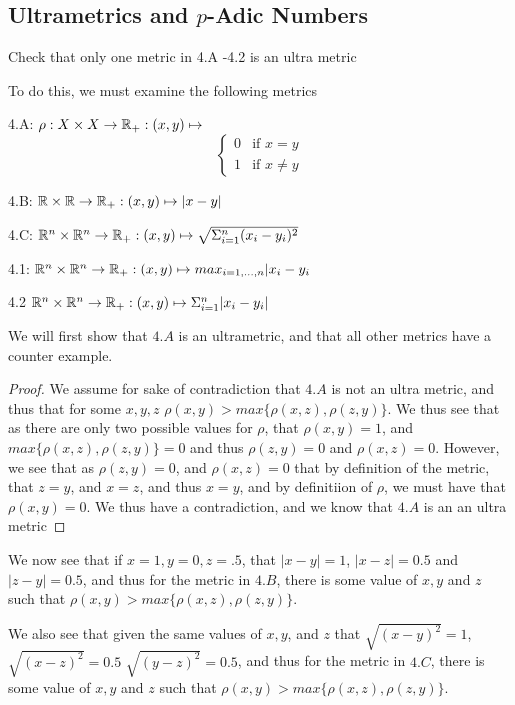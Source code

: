 \subsection{Ultrametrics and $p$-Adic Numbers}

\begin{majorEx}%
  Check that only one metric in 4.A -4.2 is an ultra metric
\end{majorEx}

To do this, we must examine the following metrics

4.A:
$\rho: X\times X \rightarrow \mathbb{R}_+: (x,y) \mapsto $
\[ \begin{cases} 
    0 & \text{if } x=y \\
    1 & \text{if } x \neq y 
  \end{cases}
  \]

4.B: $\mathbb{R} \times \mathbb{R} \rightarrow \mathbb{R}_+ :(x,y) \mapsto |x-y|$

4.C: $\mathbb{R}^n \times \mathbb{R}^n \rightarrow \mathbb{R}_+ : (x,y) \mapsto \sqrt{\Sigma_{i=1}^n (x_i-y_i)^2}$

4.1: $\mathbb{R}^n \times \mathbb{R}^n \rightarrow \mathbb{R}_+ : (x,y) \mapsto max_{i=1,...,n}|x_i-y_i$ 

4.2 $\mathbb{R}^n \times \mathbb{R}^n \rightarrow \mathbb{R}_+ : (x,y) \mapsto \Sigma_{i=1}^n |x_i - y_i|$

We will first show that $4.A$ is an ultrametric, and that all other metrics have a counter example.

\begin{proof}
  We assume for sake of contradiction that $4.A$ is not an ultra metric, and thus 
  that for some $x,y,z$ $\rho(x,y) > max \{\rho(x,z) , \rho(z,y)\}$. We thus see 
  that as there are only two possible values for $\rho$, that $\rho(x,y)=1$, and 
  $max \{\rho(x,z) , \rho(z,y)\}=0$ and thus $\rho(z,y)=0$ and $\rho(x,z)=0$. 
  However, we see that as $\rho(z,y)=0$, and $\rho(x,z)=0$ that by definition of 
  the metric, that $z=y$, and $x=z$, and thus $x=y$, and by definitiion of $\rho$, we must have that $\rho(x,y)=0$. We thus have a contradiction, and we know that $4.A$ is an an ultra metric
\end{proof}

We now see that if $x=1,y=0, z=.5$, that $|x-y|= 1$, $|x-z|=0.5$ and $|z-y|=0.5$, and thus for the metric in $4.B$, there is some value of $x,y$ and $z$ such that
$\rho(x,y) > max \{\rho(x,z) , \rho(z,y)\}$.

We also see that given the same values of $x,y$, and $z$ that
$\sqrt{(x-y)^2}=1$, $\sqrt{(x-z)^2}= 0.5$ $\sqrt{(y-z)^2}= 0.5$, and
thus for the metric in $4.C$, there is some value of $x,y$ and $z$ such that
$\rho(x,y) > max \{\rho(x,z) , \rho(z,y)\}$.

